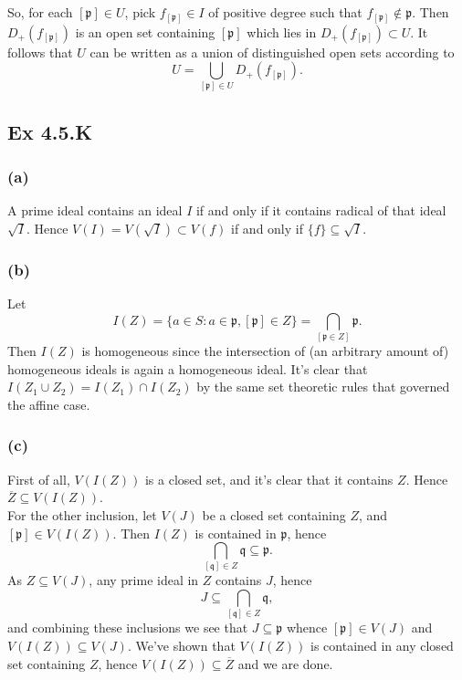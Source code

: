 \documentclass{article}
\theoremstyle{definition}
\begin{document}
So, for each $[\mathfrak{p}] \in U$, pick $f_{[\mathfrak{p}]} \in I$ of
positive degree such that $f_{[\mathfrak{p}]} \not \in \mathfrak{p}$. Then
$D_{+}(f_{[\mathfrak{p}]})$ is an open set containing $[\mathfrak{p}]$ which
lies in $D_{+}(f_{[\mathfrak{p}]}) \subset U$. It follows that $U$ can be
written as a union of distinguished open sets according to
\[
	U = \bigcup_{[\mathfrak{p}] \in U} D_{+}(f_{[\mathfrak{p}]}).
\] 

\subsection*{Ex 4.5.K}
\subsubsection*{(a)}


A prime ideal contains an ideal $I$ if and only if it contains
radical of that ideal $\sqrt{I}$. Hence $V(I) = V(\sqrt{I}) \subset V(f)$ if
and only if $\{f\} \subseteq \sqrt{I}$.

\subsubsection*{(b)}

Let
\[
	I(Z) 
	= 
	\{a \in S : a \in \mathfrak{p}, [\mathfrak{p}] \in Z\} 
	= 
	\bigcap_{[\mathfrak{p} \in Z]} \mathfrak{p}.
\]
Then $I(Z)$ is homogeneous since the intersection of (an arbitrary amount of)
homogeneous ideals is again a homogeneous ideal. It's clear that $I(Z_1 \cup
Z_2) = I(Z_1) \cap I(Z_2)$ by the same set theoretic rules that governed the
affine case.

\subsubsection*{(c)}

First of all, $V(I(Z))$ is a closed set, and it's clear that it contains $Z$.
Hence $\overline{Z} \subseteq V(I(Z))$. \\

For the other inclusion, let $V(J)$ be a closed set containing $Z$, and
$[\mathfrak{p}] \in V(I(Z))$. Then $I(Z)$ is contained in $\mathfrak{p}$,
hence 
\[
	\bigcap_{[\mathfrak{q}] \in Z} \mathfrak{q}
	\subseteq
	\mathfrak{p}.
\] 
As $Z \subseteq V(J)$, any prime ideal in $Z$ contains $J$, hence 
\[
	J
	\subseteq
	\bigcap_{[\mathfrak{q}] \in Z} \mathfrak{q},
\]
and combining these inclusions we see that $J \subseteq \mathfrak{p}$ whence
$[\mathfrak{p}] \in V(J)$ and $V(I(Z)) \subseteq V(J)$. We've shown that
$V(I(Z))$ is contained in any closed set containing $Z$, hence $V(I(Z))
\subseteq \overline{Z}$ and we are done.
\end{document}

